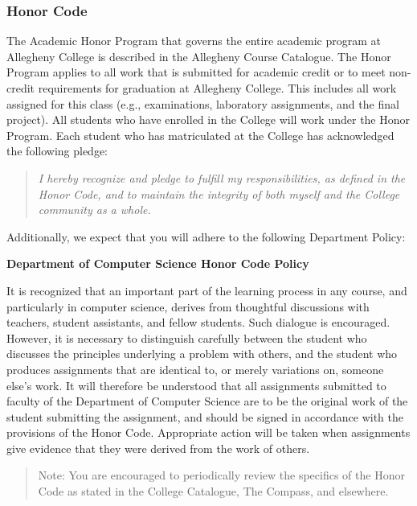 \documentclass[11pt]{article} %
\begin{document}
\subsubsection*{\textbf{Honor Code}}

The Academic Honor Program that governs the entire academic program at Allegheny College is described in the Allegheny Course Catalogue.  The Honor Program applies to all work that is submitted for academic credit or to meet non-credit requirements for graduation at Allegheny College.  This includes all work assigned for this class (e.g., examinations, laboratory assignments, and the final project).  All students who have enrolled in the College will work under the Honor Program. Each student who has matriculated at the College has acknowledged the following pledge:

\vspace*{-.1in}
\begin{quote}
\emph{I hereby recognize and pledge to fulfill my responsibilities, as defined in the Honor Code, and to maintain the integrity of both myself and the College community as a whole.}
\end{quote}
\vspace*{-.1in}

\noindent Additionally, we expect that you will adhere to the following Department Policy:

\begin{center} \textbf{ Department of Computer Science Honor Code Policy } \end{center}
\vspace*{-.1in}
It is recognized that an important part of the learning process in any course, and particularly in computer science, derives from thoughtful discussions with teachers, student assistants, and fellow students. Such dialogue is encouraged. However, it is necessary to distinguish carefully between the student who discusses the principles underlying a problem with others, and the student who produces assignments that are identical to, or merely variations on, someone else's work. It will therefore be understood that all assignments submitted to faculty of the Department of Computer Science are to be the original work of the student submitting the assignment, and should be signed in accordance with the provisions of the Honor Code. Appropriate action will be taken when assignments give evidence that they were derived from the work of others.

\begin{quote}
Note: You are encouraged to periodically review the specifics of the Honor Code as stated in the College Catalogue, The Compass, and elsewhere.
 \end{quote}
\end{document}
